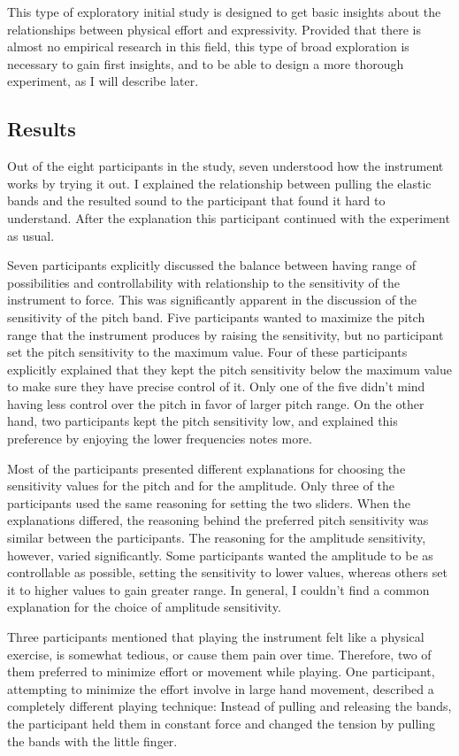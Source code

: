 \documentclass{sigchi}
\begin{document}
This type of exploratory initial study is designed to get basic insights about the relationships between physical effort and expressivity.
Provided that there is almost no empirical research in this field, this type of broad exploration is necessary to gain first insights, and to be able to design a more thorough experiment, as I will describe later.

\subsection{Results}

Out of the eight participants in the study, seven understood how the instrument works by trying it out.
I explained the relationship between pulling the elastic bands and the resulted sound to the participant that found it hard to understand.
After the explanation this participant continued with the experiment as usual.

Seven participants explicitly discussed the balance between having range of possibilities and controllability with relationship to the sensitivity of the instrument to force.
This was significantly apparent in the discussion of the sensitivity of the pitch band.
Five participants wanted to maximize the pitch range that the instrument produces by raising the sensitivity, but no participant set the pitch sensitivity to the maximum value.
Four of these participants explicitly explained that they kept the pitch sensitivity below the maximum value to make sure they have precise control of it.
Only one of the five didn't mind having less control over the pitch in favor of larger pitch range.
On the other hand, two participants kept the pitch sensitivity low, and explained this preference by enjoying the lower frequencies notes more.

Most of the participants presented different explanations for choosing the sensitivity values for the pitch and for the amplitude.
Only three of the participants used the same reasoning for setting the two sliders.
When the explanations differed, the reasoning behind the preferred pitch sensitivity was similar between the participants.
The reasoning for the amplitude sensitivity, however, varied significantly.
Some participants wanted the amplitude to be as controllable as possible, setting the sensitivity to lower values, whereas others set it to higher values to gain greater range.
In general, I couldn't find a common explanation for the choice of amplitude sensitivity.

Three participants mentioned that playing the instrument felt like a physical exercise, is somewhat tedious, or cause them pain over time.
Therefore, two of them preferred to minimize effort or movement while playing.
One participant, attempting to minimize the effort involve in large hand movement, described a completely different playing technique:
Instead of pulling and releasing the bands, the participant held them in constant force and changed the tension by pulling the bands with the little finger.
\end{document}
